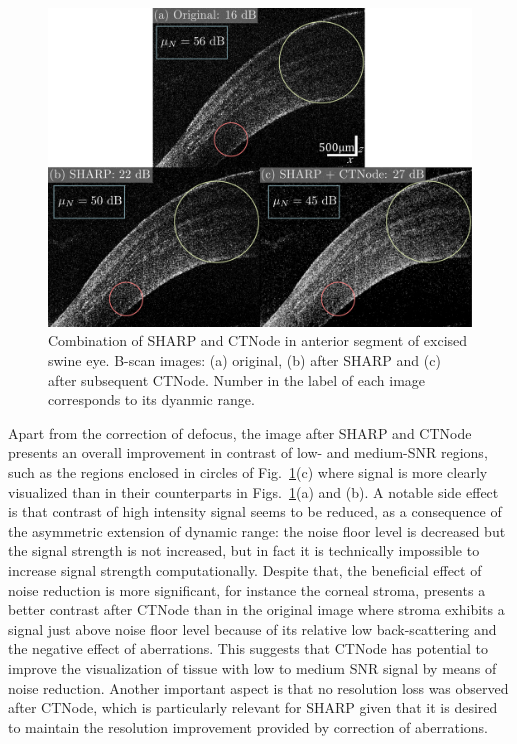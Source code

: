 \begin{figure}[htb!]
	\centering
	\includegraphics[width=\textwidth]{Figures/Results/ASImaging-CTNode.pdf}
	\caption[Combination of SHARP and CTNode in anterior segment of excised swine eye.]{Combination of SHARP and CTNode in anterior segment of excised swine eye. B-scan images: (a) original, (b) after SHARP and (c) after subsequent CTNode. Number in the label of each image corresponds to its dyanmic range.}
	\label{fig:ASImaging_CTNode}
\end{figure}

Apart from the correction of defocus, the image after SHARP and CTNode presents an overall improvement in contrast of low- and medium-SNR regions, such as the regions enclosed in circles of Fig.~\ref{fig:ASImaging_CTNode}(c) where signal is more clearly visualized than in their counterparts in Figs.~\ref{fig:ASImaging_CTNode}(a) and (b). A notable side effect is that contrast of high intensity signal seems to be reduced, as a consequence of the asymmetric extension of dynamic range: the noise floor level is decreased but the signal strength is not increased, but in fact it is technically impossible to increase signal strength computationally. Despite that, the beneficial effect of noise reduction is more significant, for instance the corneal stroma, presents a better contrast after CTNode than in the original image where stroma exhibits a signal just above noise floor level because of its relative low back-scattering and the negative effect of aberrations. This suggests that CTNode has potential to improve the visualization of tissue with low to medium SNR signal by means of noise reduction. Another important aspect is that no resolution loss was observed after CTNode, which is particularly relevant for SHARP given that it is desired to maintain the resolution improvement provided by correction of aberrations.

